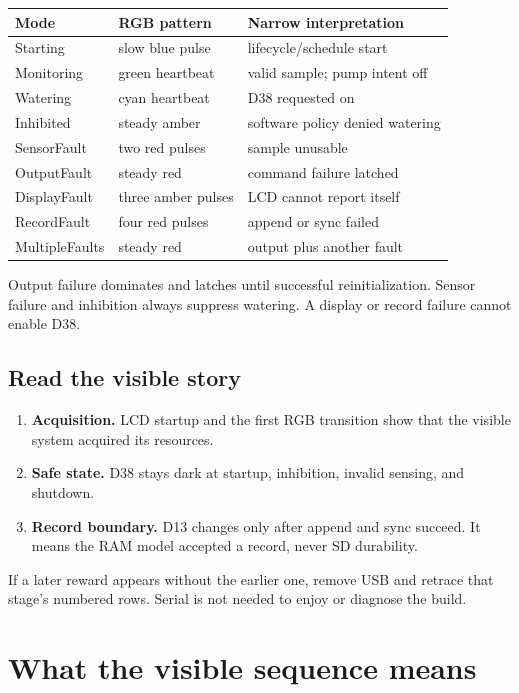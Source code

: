 \documentclass[11pt]{article}
\begin{document}
\begin{tabularx}{\linewidth}{@{}l X X@{}}
\toprule
Mode & RGB pattern & Narrow interpretation\\
\midrule
Starting & slow blue pulse & lifecycle/schedule start\\
Monitoring & green heartbeat & valid sample; pump intent off\\
Watering & cyan heartbeat & D38 requested on\\
Inhibited & steady amber & software policy denied watering\\
SensorFault & two red pulses & sample unusable\\
OutputFault & steady red & command failure latched\\
DisplayFault & three amber pulses & LCD cannot report itself\\
RecordFault & four red pulses & append or sync failed\\
MultipleFaults & steady red & output plus another fault\\
\bottomrule
\end{tabularx}

Output failure dominates and latches until successful reinitialization. Sensor
failure and inhibition always suppress watering. A display or record failure
cannot enable D38.

\subsection{Read the visible story}

\begin{enumerate}
  \item \textbf{Acquisition.} LCD startup and the first RGB transition show
        that the visible system acquired its resources.
  \item \textbf{Safe state.} D38 stays dark at startup, inhibition, invalid
        sensing, and shutdown.
  \item \textbf{Record boundary.} D13 changes only after append and sync
        succeed. It means the RAM model accepted a record, never SD durability.
\end{enumerate}

If a later reward appears without the earlier one, remove USB and retrace that
stage's numbered rows. Serial is not needed to enjoy or diagnose the build.

\section{What the visible sequence means}
\end{document}
